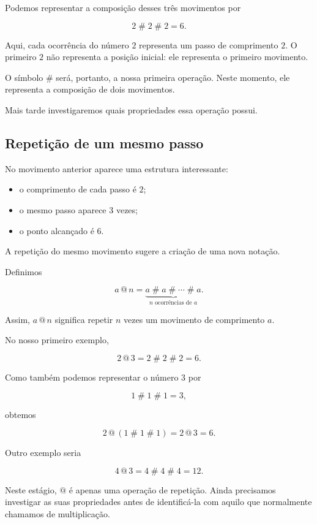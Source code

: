 \documentclass[12pt,a4paper]{article}
\makeatletter
\newcommand{\mov}{\mathbin{\#}}
\newcommand{\rep}{\mathbin{@}}
\makeatother
\begin{document}
Podemos representar a composição desses três movimentos por

\[
    2\mov 2\mov 2=6.
\]

Aqui, cada ocorrência do número \(2\) representa um passo de comprimento
\(2\). O primeiro \(2\) não representa a posição inicial: ele representa
o primeiro movimento.

O símbolo \(\mov\) será, portanto, a nossa primeira operação. Neste
momento, ele representa a composição de dois movimentos.

Mais tarde investigaremos quais propriedades essa operação possui.

\subsection{Repetição de um mesmo passo}

No movimento anterior aparece uma estrutura interessante:

\begin{itemize}
    \item o comprimento de cada passo é \(2\);
    \item o mesmo passo aparece \(3\) vezes;
    \item o ponto alcançado é \(6\).
\end{itemize}

A repetição do mesmo movimento sugere a criação de uma nova notação.

Definimos

\[
    a\rep n
    =
    \underbrace{a\mov a\mov\cdots\mov a}_{n\text{ ocorrências de }a}.
\]

Assim, \(a\rep n\) significa repetir \(n\) vezes um movimento de
comprimento \(a\).

No nosso primeiro exemplo,

\[
    2\rep 3=2\mov 2\mov 2=6.
\]

Como também podemos representar o número \(3\) por

\[
    1\mov 1\mov 1=3,
\]

obtemos

\[
    2\rep(1\mov 1\mov 1)
    =
    2\rep 3
    =
    6.
\]

Outro exemplo seria

\[
    4\rep 3
    =
    4\mov 4\mov 4
    =
    12.
\]

Neste estágio, \(\rep\) é apenas uma operação de repetição. Ainda
precisamos investigar as suas propriedades antes de identificá-la
com aquilo que normalmente chamamos de multiplicação.
\end{document}
